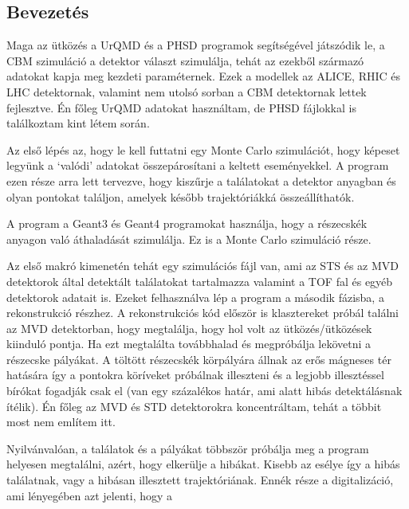 \documentclass[a4paper,12pt]{article}
\begin{document}
\subsection{ Bevezetés}
\vspace{5mm}
\par Maga az ütközés a UrQMD és a PHSD programok segítségével játszódik le, a CBM szimuláció a detektor választ szimulálja, tehát az ezekből
származó adatokat kapja meg kezdeti paraméternek. Ezek a modellek az ALICE, RHIC és LHC detektornak, valamint nem utolsó sorban a
CBM detektornak lettek fejlesztve. Én főleg UrQMD adatokat használtam, de PHSD fájlokkal is találkoztam kint létem során. 
\vspace{5mm}
\par Az első lépés az, hogy le kell futtatni egy Monte Carlo szimulációt, hogy képeset legyünk a `valódi' adatokat összepárosítani a 
keltett eseményekkel. A program ezen része arra lett tervezve, hogy kiszűrje a találatokat a detektor anyagban és olyan pontokat találjon, 
amelyek később trajektóriákká összeállíthatók.
\vspace{5mm}
\par A program a Geant3 és Geant4 programokat használja, hogy a részecskék anyagon való áthaladását szimulálja. Ez is a Monte Carlo 
szimuláció része.
\vspace{5mm}
\par Az első makró kimenetén tehát egy szimulációs fájl van, ami az STS és az MVD detektorok által detektált találatokat tartalmazza 
valamint a TOF fal és egyéb detektorok adatait is. Ezeket felhasználva lép a program a második fázisba, a rekonstrukció részhez. A rekonstrukciós 
kód először is klasztereket próbál találni az MVD detektorban, hogy megtalálja, hogy hol volt az ütközés/ütközések kiinduló pontja. Ha ezt megtalálta
továbbhalad és megpróbálja lekövetni a részecske pályákat. A töltött részecskék körpályára állnak az erős mágneses tér hatására így a pontokra
köríveket próbálnak illeszteni és a legjobb illesztéssel bírókat fogadják csak el (van egy százalékos határ, ami alatt hibás detektálásnak ítélik). Én főleg
az MVD és STD detektorokra koncentráltam, tehát a többit most nem említem itt.
\vspace{5mm}
\par Nyilvánvalóan, a találatok és a pályákat többször próbálja meg a program helyesen megtalálni, azért, hogy elkerülje a hibákat. Kisebb
az esélye így a hibás találatnak, vagy a hibásan illesztett trajektóriának. Ennék része a digitalizáció, ami lényegében azt jelenti, hogy a 
\end{document}
